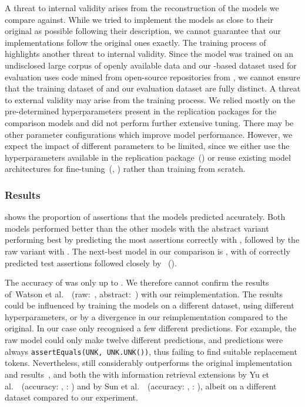 A threat to internal validity arises from the reconstruction of the
models we compare against. While we tried to implement the models as
close to their original as possible following their description, we
cannot guarantee that our implementations follow the original ones
exactly.
The training process of \chatgpt~\cite{Brown2020} highlights another
threat to internal validity. Since the model was trained on an
undisclosed large corpus of openly available data and our
\methodstotest-based dataset used for evaluation uses code mined from
open-source repositories from \github, we cannot ensure that the
training dataset of \chatgpt and our evaluation dataset are fully
distinct.
A threat to external validity may arise from the training process. We
relied mostly on the pre-determined hyperparameters present in the
replication packages for the comparison models and did not perform
further extensive tuning. There may be other parameter configurations
which improve model performance.
However, we expect the impact of different parameters to be limited,
since we either use the hyperparameters available in the replication
package~(\atlas) or reuse existing model architectures for
fine-tuning~(\bert, \bart) rather than training from scratch.


\subsubsection{Results}

 shows the proportion of assertions that
the models predicted accurately. Both \assertfive models performed
better than the other models with the abstract variant performing best
by predicting the most assertions correctly with , followed
by the raw variant with .
The next-best model in our comparison is \togaast, with  of
correctly predicted test assertions followed closely by
\chatgpt~().

The accuracy of \atlas was only up to . We therefore cannot
confirm the results of~{Watson et
al.}~\cite{Watson2020}~(raw:~, abstract:~) with
our \atlas reimplementation. The results could be influenced by
training the models on a different dataset, using different
hyperparameters, or by a divergence in our reimplementation compared
to the original.
In our case \atlas only recognised a few different predictions. For
example, the raw model could only make twelve different predictions,
and  predictions were always
\texttt{assertEquals(UNK, UNK.UNK())}, %
thus failing to find suitable replacement tokens.
Nevertheless, \assertfive still considerably outperforms the original
\atlas implementation and results~\cite{Watson2020}, and both the
\atlas with information retrieval extensions by Yu et
al.~\cite{Yu2022}~(accuracy: , \bleu: ) and by
Sun et al.~\cite{Sun2023}~(accuracy: , \bleu:
), albeit on a different dataset compared to our
experiment.

